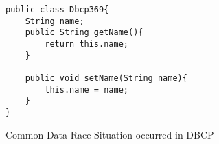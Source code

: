 \begin{figure}
   \begin{lstlisting}[style=Java-github]
public class Dbcp369{
    String name;
    public String getName(){
        return this.name;  
    }

    public void setName(String name){
        this.name = name;
    }
}
   \end{lstlisting}
    \label{fig:dataRace2}
    \caption{Common Data Race Situation occurred in DBCP}
\end{figure}

